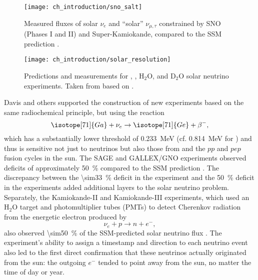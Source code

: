 \begin{figure}
    \centering
    \texttt{[image: ch\_introduction/sno\_salt]}
    \caption[SNO observation of $\phi_e$ vs. $\phi_{\mu,\tau}$]{
        Measured fluxes of solar $\nu_e$ and ``solar'' $\nu_{\mu,\tau}$
        constrained by SNO (Phases I and II) and Super-Kamiokande,
        compared to the SSM prediction \cite{sno_salt2004}.
    }
    \label{fig:sno_plots}
\end{figure}

\begin{figure}
    \centering
    \texttt{[image: ch\_introduction/solar\_resolution]}
    \caption[Solar neutrino flux  measurements]{
        Predictions and measurements for , ,
        $\text{H}_2\text{O}$, and $\text{D}_2\text{O}$ solar neutrino experiments.
        Taken from \cite{bahcall_images} based on \cite{bahcall2005_diagram}.
    }
    \label{fig:solar_neutrino_fixed}
\end{figure}

Davis and others supported the construction of
new experiments based on the same radiochemical principle,
but using the reaction
\begin{equation}\label{eq:gallium}
    \isotope[71]{Ga} + \nu_e \to \isotope[71]{Ge} + \beta^-,
\end{equation}
which has a substantially lower threshold
of \SI{0.233}{\MeV} (cf. \SI{0.814}{\MeV} for )
and thus is sensitive not just to  neutrinos
but also those from  and the $pp$ and $pep$ fusion cycles in the sun.
The SAGE and GALLEX/GNO experiments observed deficits of approximately \SI{50}{\percent}
compared to the SSM prediction \cite{sage,gallex}.
The discrepancy between the \SI{\sim33}{\percent} deficit
in the  experiment
and the \SI{50}{\percent} deficit in the  experiments
added additional layers to the solar neutrino problem.
Separately, the Kamiokande-II and Kamiokande-III experiments,
which used an $\text{H}_2\text{O}$ target
and photomultiplier tubes (PMTs)
to detect Cherenkov radiation from the energetic electron produced by
\begin{equation}\label{eq:kamiokande}
    \nu_e + p \to n + e^-,
\end{equation}
also observed \SI{\sim50}{\percent} of the SSM-predicted solar neutrino flux
\cite{kamiokande_III}.
The experiment's ability to assign a timestamp and direction to each neutrino event
also led to the first direct confirmation that these neutrinos
actually originated from the sun:
the outgoing $e^-$ tended to point away from the sun,
no matter the time of day or year.

